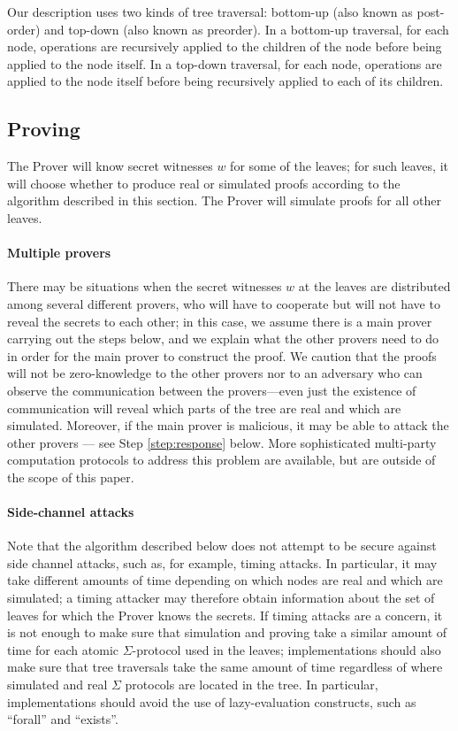 \documentclass[11pt]{article}
\begin{document}
Our description uses two kinds of tree traversal: bottom-up (also known as post-order) and top-down (also known as preorder). In a bottom-up traversal, for each node, operations are recursively applied to the children of the node before being applied to the node itself. In a top-down traversal, for each node, operations are applied to the node itself before being recursively applied to each of its children.

\subsection{Proving}
\label{sec:proving}

The Prover will know secret witnesses $w$ for some of the leaves; for such leaves, it will choose whether to produce real or simulated proofs according to the algorithm described in this section. The Prover will simulate proofs for all other leaves.

\paragraph{Multiple provers} There may be situations when the secret witnesses $w$ at the leaves are distributed among several different provers, who will have to cooperate but will not have to reveal the secrets to each other; in this case, we assume there is a main prover carrying out the steps below, and we explain what the other provers need to do in order for the main prover to construct the proof. We caution that the proofs will not be zero-knowledge to the other provers nor to an adversary who can observe the communication between the provers---even just the existence of communication will reveal which parts of the tree are real and which are simulated. Moreover, if the main prover is malicious, it may be able to attack the other provers --- see Step \ref{step:response} below. More sophisticated multi-party computation protocols to address this problem are available, but are outside of the scope of this paper.


\paragraph{Side-channel attacks}
Note that the algorithm described below does not attempt to be secure against side channel attacks, such as, for example, timing attacks. In particular, it may take different amounts of time depending on which nodes are real and which are simulated; a timing attacker may therefore obtain information about the set of leaves for which the Prover knows the secrets. If timing attacks are a concern, it is not enough to make sure that simulation and proving take a similar amount of time for each atomic $\Sigma$-protocol used in the leaves; implementations should also make sure that tree traversals take the same amount of time regardless of where simulated and real $\Sigma$ protocols are located in the tree. In particular, implementations should avoid the use of lazy-evaluation constructs, such as ``forall'' and ``exists''.
\end{document}
